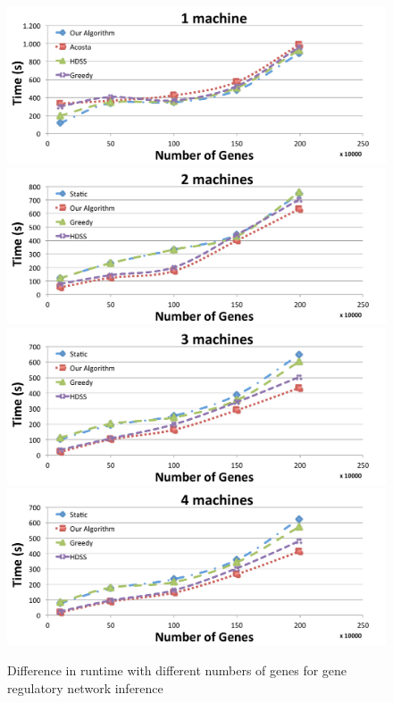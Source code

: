 \documentclass[journal]{IEEEtran}
\begin{document}
\begin{figure}[htb]
	\begin{center}
	\centering
		\includegraphics[scale=0.3]{1machineGene.pdf} \quad
		\includegraphics[scale=0.3]{2machineGenes.pdf} \quad
		\includegraphics[scale=0.3]{3machineGenes.pdf} \quad
		\includegraphics[scale=0.3]{4machineGenes.pdf} 
	\caption{Difference in runtime with different numbers of genes for gene regulatory network inference}
	\label{fig:Gene}
	\end{center}
\end{figure}
\end{document}

